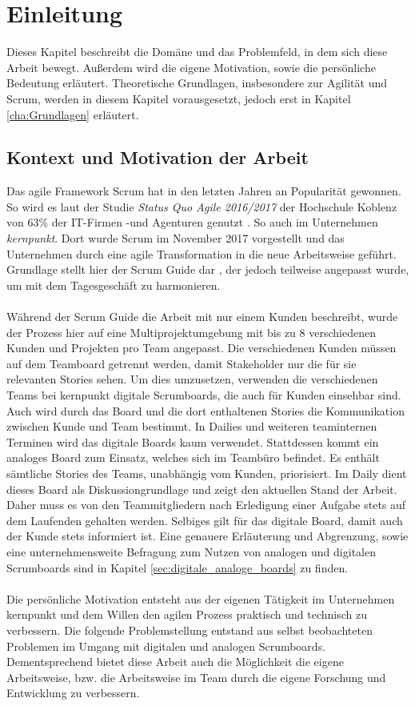 \chapter{Einleitung}
\label{cha:Einleitung}

Dieses Kapitel beschreibt die Domäne und das Problemfeld, in dem sich diese Arbeit bewegt. Außerdem wird die eigene Motivation, sowie die persönliche Bedeutung erläutert. Theoretische Grundlagen, insbesondere zur Agilität und Scrum, werden in diesem Kapitel vorausgesetzt, jedoch erst in Kapitel \ref{cha:Grundlagen} erläutert.

\section{Kontext und Motivation der Arbeit}
\label{sec:kontext_motivation}
Das agile Framework Scrum hat in den letzten Jahren an Popularität gewonnen. So wird es laut der Studie \textit{Status Quo Agile 2016/2017} der Hochschule Koblenz von 63\% der IT-Firmen -und Agenturen genutzt \cite{statusquoagile}. So auch im Unternehmen \textit{kernpunkt}. Dort wurde Scrum im November 2017 vorgestellt und das Unternehmen durch eine agile Transformation in die neue Arbeitsweise geführt. Grundlage stellt hier der Scrum Guide dar \cite{scrumguide}, der jedoch teilweise angepasst wurde, um mit dem Tagesgeschäft zu harmonieren. 
\\ \\
Während der Scrum Guide die Arbeit mit nur einem Kunden beschreibt, wurde der Prozess hier auf eine Multiprojektumgebung mit bis zu 8 verschiedenen Kunden und Projekten pro Team angepasst. Die verschiedenen Kunden müssen auf dem Teamboard getrennt werden, damit Stakeholder nur die für sie relevanten Stories sehen. Um dies umzusetzen, verwenden die verschiedenen Teams bei kernpunkt digitale Scrumboards, die auch für Kunden einsehbar sind. Auch wird durch das Board und die dort enthaltenen Stories die Kommunikation zwischen Kunde und Team bestimmt. In Dailies und weiteren teaminternen Terminen wird das digitale Boards kaum verwendet. Stattdessen kommt ein analoges Board zum Einsatz, welches sich im Teambüro befindet. Es enthält sämtliche Stories des Teams, unabhängig vom Kunden, priorisiert. Im Daily dient dieses Board als Diskussiongrundlage und zeigt den aktuellen Stand der Arbeit. Daher muss es von den Teammitgliedern nach Erledigung einer Aufgabe stets auf dem Laufenden gehalten werden. Selbiges gilt für das digitale Board, damit auch der Kunde stets informiert ist. Eine genauere Erläuterung und Abgrenzung, sowie eine unternehmensweite Befragung zum Nutzen von analogen und digitalen Scrumboards sind in Kapitel \ref{sec:digitale_analoge_boards} zu finden. \\
\\
Die persönliche Motivation entsteht aus der eigenen Tätigkeit im Unternehmen kernpunkt und dem Willen den agilen Prozess praktisch und technisch zu verbessern. Die folgende Problemstellung entstand aus selbst beobachteten Problemen im Umgang mit digitalen und analogen Scrumboards. Dementsprechend bietet diese Arbeit auch die Möglichkeit die eigene Arbeitsweise, bzw. die Arbeitsweise im Team durch die eigene Forschung und Entwicklung zu verbessern.

